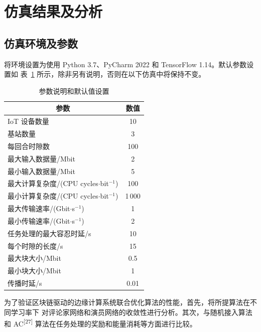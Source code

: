 \section{仿真结果及分析}

\subsection{仿真环境及参数}

将环境设置为使用 Python 3.7、PyCharm 2022 和 TensorFlow 1.14。默认参数设置如
表~\ref{tab:params} 所示，除非另有说明，否则在以下仿真中将保持不变。

\begin{table}[H]
  \centering
  \caption{参数说明和默认值设置}
  \label{tab:params}
  \renewcommand{\arraystretch}{1.2}
  \begin{tabularx}{\linewidth}{X c}
    \toprule
    \multicolumn{1}{c}{参数} & \multicolumn{1}{c}{数值} \\
    \midrule
    IoT 设备数量 & 10 \\
    基站数量 & 3 \\
    每回合时隙数 & 100 \\
    最大输入数据量/Mbit & 2 \\
    最小输入数据量/Mbit & 5 \\
    最大计算复杂度/(CPU cycles$\cdot$bit$^{-1}$) & 100 \\
    最小计算复杂度/(CPU cycles$\cdot$bit$^{-1}$) & 1\,000 \\
    最大传输速率/(Gbit$\cdot$s$^{-1}$) & 1 \\
    最小传输速率/(Gbit$\cdot$s$^{-1}$) & 2 \\
    任务处理的最大容忍时延/s & 10 \\
    每个时隙的长度/s & 15 \\
    最大块大小/Mbit & 0.5 \\
    最小块大小/Mbit & 1 \\
    传播时延/s & 0.01 \\
    \bottomrule
  \end{tabularx}
\end{table}

为了验证区块链驱动的边缘计算系统联合优化算法的性能，首先，将所提算法在不同学习率下
对评论家网络和演员网络的收敛性进行分析。其次，与随机接入算法和 AC\textsuperscript{[27]}
算法在任务处理的奖励和能量消耗等方面进行比较。

